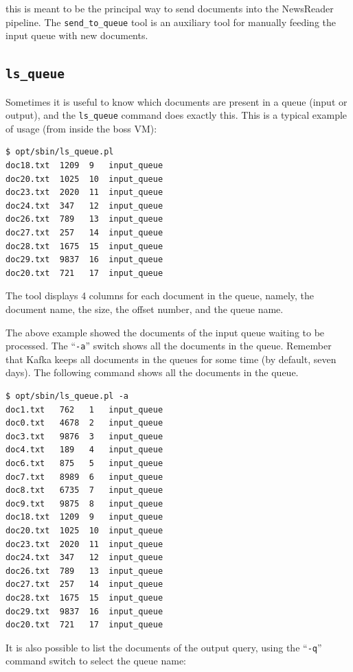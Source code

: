 \documentclass[a4]{article}
\newcommand{\todo}[1]{\textcolor{red}{\noindent$\rightarrow$ TODO: #1}}
\begin{document}

\noindent this is meant to be the principal way to send documents into the
NewsReader pipeline. The \texttt{send\_to\_queue} tool is an auxiliary tool
for manually feeding the input queue with new documents.

\subsection*{\texttt{ls\_queue}}
\label{sec:ls_queue}

Sometimes it is useful to know which documents are present in a queue (input
or output), and the \texttt{ls\_queue} command does exactly this. This is a
typical example of usage (from inside the \textrm{boss} VM):

\begin{verbatim}
$ opt/sbin/ls_queue.pl
doc18.txt  1209  9   input_queue
doc20.txt  1025  10  input_queue
doc23.txt  2020  11  input_queue
doc24.txt  347   12  input_queue
doc26.txt  789   13  input_queue
doc27.txt  257   14  input_queue
doc28.txt  1675  15  input_queue
doc29.txt  9837  16  input_queue
doc20.txt  721   17  input_queue
\end{verbatim}

The tool displays 4 columns for each document in the queue, namely, the
document name, the size, the offset number, and the queue name.

The above example showed the documents of the input queue waiting to be
processed. The ``\texttt{-a}'' switch shows all the documents in the
queue. Remember that Kafka keeps all documents in the queues for some time
(by default, seven days). The following command shows all the documents in
the queue.

\begin{verbatim}
$ opt/sbin/ls_queue.pl -a
doc1.txt   762   1   input_queue
doc0.txt   4678  2   input_queue
doc3.txt   9876  3   input_queue
doc4.txt   189   4   input_queue
doc6.txt   875   5   input_queue
doc7.txt   8989  6   input_queue
doc8.txt   6735  7   input_queue
doc9.txt   9875  8   input_queue
doc18.txt  1209  9   input_queue
doc20.txt  1025  10  input_queue
doc23.txt  2020  11  input_queue
doc24.txt  347   12  input_queue
doc26.txt  789   13  input_queue
doc27.txt  257   14  input_queue
doc28.txt  1675  15  input_queue
doc29.txt  9837  16  input_queue
doc20.txt  721   17  input_queue
\end{verbatim}

It is also possible to list the documents of the output query, using the
``\texttt{-q}'' command switch to select the queue name:
\end{document}
